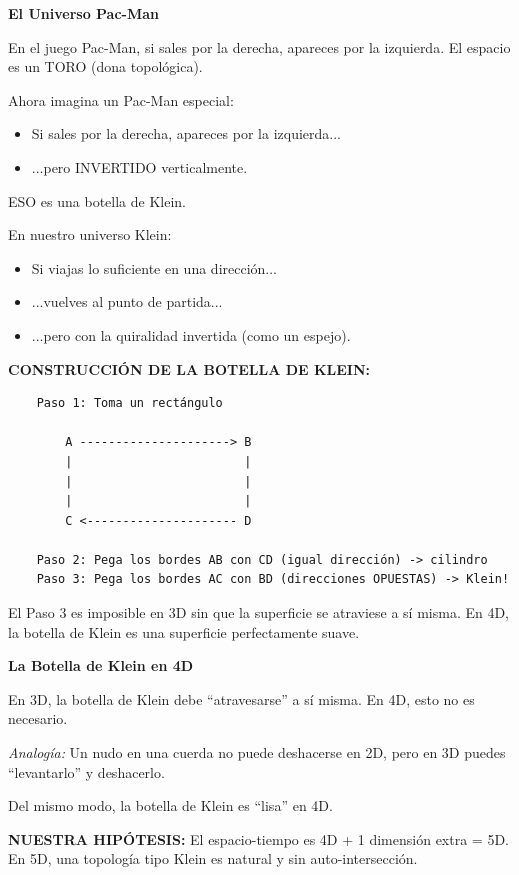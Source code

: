\begin{analogiabox}
\textbf{El Universo Pac-Man}

En el juego Pac-Man, si sales por la derecha, apareces por la izquierda.
El espacio es un TORO (dona topológica).

Ahora imagina un Pac-Man especial:
\begin{itemize}
    \item Si sales por la derecha, apareces por la izquierda...
    \item ...pero INVERTIDO verticalmente.
\end{itemize}

ESO es una botella de Klein.

En nuestro universo Klein:
\begin{itemize}
    \item Si viajas lo suficiente en una dirección...
    \item ...vuelves al punto de partida...
    \item ...pero con la quiralidad invertida (como un espejo).
\end{itemize}
\end{analogiabox}

\textbf{CONSTRUCCIÓN DE LA BOTELLA DE KLEIN:}

\begin{verbatim}
    Paso 1: Toma un rectángulo

        A ---------------------> B
        |                        |
        |                        |
        |                        |
        C <--------------------- D

    Paso 2: Pega los bordes AB con CD (igual dirección) -> cilindro
    Paso 3: Pega los bordes AC con BD (direcciones OPUESTAS) -> Klein!
\end{verbatim}

El Paso 3 es imposible en 3D sin que la superficie se atraviese a sí misma.
En 4D, la botella de Klein es una superficie perfectamente suave.

\begin{nivelconceptual}
\textbf{La Botella de Klein en 4D}

En 3D, la botella de Klein debe ``atravesarse'' a sí misma.
En 4D, esto no es necesario.

\textit{Analogía:} Un nudo en una cuerda no puede deshacerse en 2D,
pero en 3D puedes ``levantarlo'' y deshacerlo.

Del mismo modo, la botella de Klein es ``lisa'' en 4D.

\textbf{NUESTRA HIPÓTESIS:} El espacio-tiempo es 4D + 1 dimensión extra = 5D.
En 5D, una topología tipo Klein es natural y sin auto-intersección.
\end{nivelconceptual}


